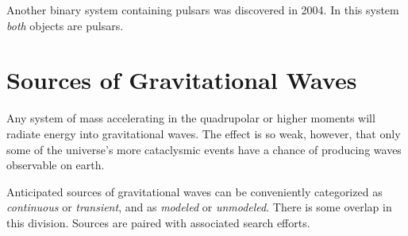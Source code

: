 Another binary system containing pulsars was discovered in 2004.  In
this system \emph{both} objects are
pulsars. \cite{Lyne2004DoublePulsar,Kramer2006Tests}

\section{Sources of Gravitational Waves}
Any system of mass accelerating in the quadrupolar or higher moments
will radiate energy into gravitational waves.  The effect is so weak,
however, that only some of the universe's more cataclysmic events have
a chance of producing waves observable on earth.

Anticipated sources of gravitational waves can be conveniently
categorized as \emph{continuous} or \emph{transient}, and as
\emph{modeled} or \emph{unmodeled}.  There is some overlap in this
division.  Sources are paired with associated search efforts.


